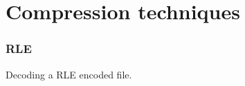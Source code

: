 \begin{comment}
  
\end{comment}

\chapter{Compression techniques}
\label{cha:digital-image}

\subsection{RLE}
\label{sec:rle}

\begin{algorithm}
  \caption{Decoding a RLE encoded file.}
  \begin{algorithmic}[1]
     
      \Else
          \State {}
        \EndRepeat
      \EndIf
    \EndWhile
  \end{algorithmic}
\end{algorithm}

\printbibliography[heading=subbibliography]